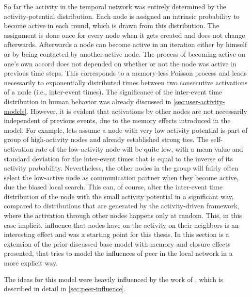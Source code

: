 So far the activity in the temporal network was entirely determined by the activity-potential distribution.
Each node is assigned an intrinsic probability to become active in each round, which is drawn from this distribution.
The assignment is done once for every node when it gets created and does not change afterwards.
Afterwards a node can become active in an iteration either by himself or by being contacted by another active node.
The process of becoming active on one's own accord does not depended on whether or not the node was active in previous time steps.
This corresponds to a memory-less Poisson process and leads necessarily to exponentially distributed times between two consecutive activations of a node (i.e., inter-event times).
The significance of the inter-event time distribution in human behavior was already discussed in \autoref{sec:user-activity-models}.
However, it is evident that activations by other nodes are not necessarily independent of previous events, due to the memory effects introduced in the model.
For example, lets assume a node with very low activity potential is part of group of high-activity nodes and already established strong ties.
The self-activation rate of the low-activity node will be quite low, with a mean value and standard deviation for the inter-event times that is equal to the inverse of its activity probability.
Nevertheless, the other nodes in the group will fairly often select the low-active node as communication partner when they become active, due the biased local search.
This can, of course, alter the inter-event time distribution of the node with the small activity potential in a significant way, compared to distributions that are generated by the activity-driven framework, where the activation through other nodes happens only at random.
This, in this case implicit, influence that nodes have on the activity on their neighbors is an interesting effect and was a starting point for this thesis.
In this section is a extension of the prior discussed base model with memory and closure effects presented, that tries to model the influences of peer in the local network in a more explicit way.

The ideas for this model were heavily influenced by the work of \citet{Walk2016}, which is described in detail in \autoref{sec:peer-influence}.


